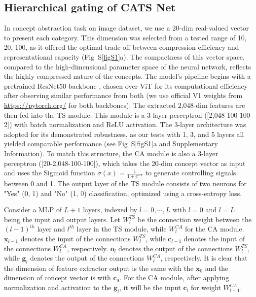\documentclass[pdflatex,sn-mathphys-num,lineno]{sn-jnl}%
\begin{document}
\begin{CJK}{UTF8}{gbsn}
\subsection{Hierarchical gating of CATS Net}
In concept abstraction task on image dataset, we use a 20-dim real-valued vector to present each category. This dimension was selected from a tested range of {10, 20, 100}, as it offered the optimal trade-off between compression efficiency and representational capacity (Fig~S\ref{figS1}a). The compactness of this vector space, compared to the high-dimensional parameter space of the neural network, reflects the highly compressed nature of the concepts. The model's pipeline begins with a pretrained ResNet50 backbone \cite{he_deep_2016}, chosen over ViT \cite{dosovitskiy_image_2021} for its computational efficiency after observing similar performance from both (we use official V1 weights from \url{https://pytorch.org/} for both backbones). The extracted 2,048-dim features are then fed into the TS module. This module is a 3-layer perceptron ([2,048-100-100-2]) with batch normalization and ReLU activation. The 3-layer architecture was adopted for its demonstrated robustness, as our tests with 1, 3, and 5 layers all yielded comparable performance (see Fig~S\ref{figS1}a and Supplementary Information). To match this structure, the CA module is also a 3-layer perceptron ([20-2,048-100-100]), which takes the 20-dim concept vector as input and uses the Sigmoid function $\sigma(x) = \frac{1}{1 + e^{-x}}$ to generate controlling signals between 0 and 1. The output layer of the TS module consists of two neurons for "Yes" (0, 1) and "No" (1, 0) classification, optimized using a cross-entropy loss. 

Consider a MLP of $L+1$ layers, indexed by $l=0,\cdots,L$ with $l = 0$ and $l = L$ being the input and output layers. Let $W_l^{TS}$ be the connection weight between the $(l-1)^{th}$ layer and $l^{th}$ layer in the TS module, while $W_l^{CA}$ for the CA module. $\mathbf{x}_{l-1}$ denotes the input of the connections $W_l^{TS}$, while $\mathbf{c}_{l-1}$ denotes the input of the connections $W_l^{CA}$, respectively. $\mathbf{o}_{l}$ denotes the output of the connections $W_l^{TS}$, while $\mathbf{g}_{l}$ denotes the output of the connections $W_l^{CA}$, respectively. It is clear that the dimension of feature extractor output is the same with the $\mathbf{x}_{0}$ and the dimension of concept vector is with $\mathbf{c}_{0}$. For the CA module, after applying normalization and activation to the $\mathbf{g}_{l}$, it will be the input $\mathbf{c}_{l}$ for weight $W_{l+1}^{CA}$.


\end{CJK}
\end{document}
